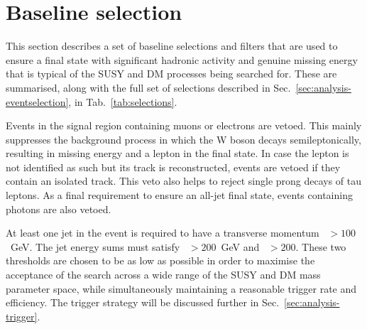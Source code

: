 

\section{Baseline selection}
\label{sec:analysis-baselineselections}

This section describes a set of baseline selections and filters that are used 
to ensure a final state with significant hadronic activity and genuine missing 
energy that is typical of the SUSY and DM processes being searched for. These 
are summarised, along with the full set of selections described in 
Sec.~\ref{sec:analysis-eventselection}, in Tab.~\ref{tab:selections}.

Events in the signal region containing muons or electrons are vetoed. This 
mainly suppresses the 
\wj background process in which the W boson decays semileptonically, 
resulting in missing energy and a lepton in the final state. In case the lepton 
is not identified as such but its track is reconstructed, events are vetoed if 
they contain an isolated track. This veto also helps to reject single prong 
decays of tau leptons. %
As a final requirement to ensure an all-jet final state, events containing 
photons are also vetoed.

At least one jet in the event is required to have a transverse momentum 
{\pt~$>100$~GeV}. The jet energy sums must satisfy {\scalht~$>200$~GeV} and 
{\mht~$>200$}. 
These two thresholds are chosen to be as low as possible in order to maximise 
the acceptance of the search across a wide range of the SUSY and DM mass 
parameter space, while simultaneously maintaining a reasonable trigger rate and 
efficiency. The trigger strategy will be discussed further in 
Sec.~\ref{sec:analysis-trigger}.

